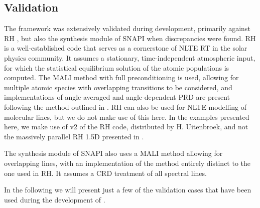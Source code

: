 \subsection{Validation}

The \Lw{} framework was extensively validated during development, primarily against RH \citep{Uitenbroek2001}, but also the synthesis module of SNAPI \citep{Milic2018} when discrepancies were found.
RH is a well-established code that serves as a cornerstone of NLTE RT in the solar physics community.
It assumes a stationary, time-independent atmospheric input, for which the statistical equilibrium solution of the atomic populations is computed.
The MALI method with full preconditioning \citep{Rybicki1992} is used, allowing for multiple atomic species with overlapping transitions to be considered, and implementations of angle-averaged and angle-dependent PRD are present following the method outlined in \citet{Uitenbroek2001}.
RH can also be used for NLTE modelling of molecular lines, but we do not make use of this here.
In the examples presented here, we make use of v2 of the RH code, distributed by H. Uitenbroek, and not the massively parallel RH 1.5D presented in \citet{Pereira2015}.

The synthesis module of SNAPI also uses a MALI method allowing for overlapping lines, with an implementation of the method entirely distinct to the one used in RH.
It assumes a CRD treatment of all spectral lines.

In the following we will present just a few of the validation cases that have been used during the development of \Lw{}.

